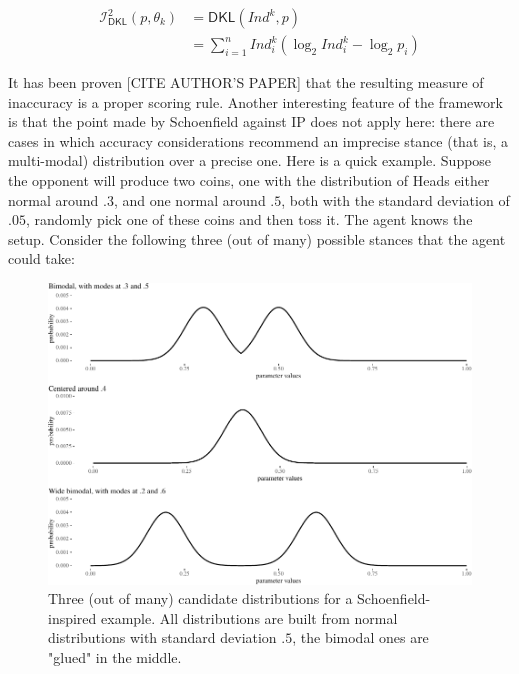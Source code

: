 \documentclass[
  10pt,
  dvipsnames,enabledeprecatedfontcommands]{scrartcl}
\begin{document}
\begin{align*}
\mathcal{I}_{\mathsf{DKL}}^2(p, \theta_k) & = \mathsf{DKL}(Ind^k,p) \\
& = \sum_{i=1}^n Ind^k_i \left( \log_2 Ind^k_i - \log_2 p_i \right)
\end{align*}

It has been proven {[}CITE AUTHOR'S PAPER{]} that the resulting measure
of inaccuracy is a proper scoring rule. Another interesting feature of
the framework is that the point made by Schoenfield against \textsf{IP}
does not apply here: there are cases in which accuracy considerations
recommend an imprecise stance (that is, a multi-modal) distribution over
a precise one. Here is a quick example. Suppose the opponent will
produce two coins, one with the distribution of Heads either normal
around \(.3\), and one normal around \(.5\), both with the standard
deviation of \(.05\), randomly pick one of these coins and then toss it.
The agent knows the setup. Consider the following three (out of many)
possible stances that the agent could take:

\begin{figure}[H]

\begin{center}\includegraphics[width=1\linewidth]{imprecision_weight_files/figure-latex/figEMC-1} \end{center}
\caption{Three (out of many) candidate distributions for a Schoenfield-inspired example. All distributions are built from normal  distributions with standard deviation $.5$, the bimodal ones are "glued" in the middle.}
\label{fig:EMC}
\end{figure}
\end{document}
